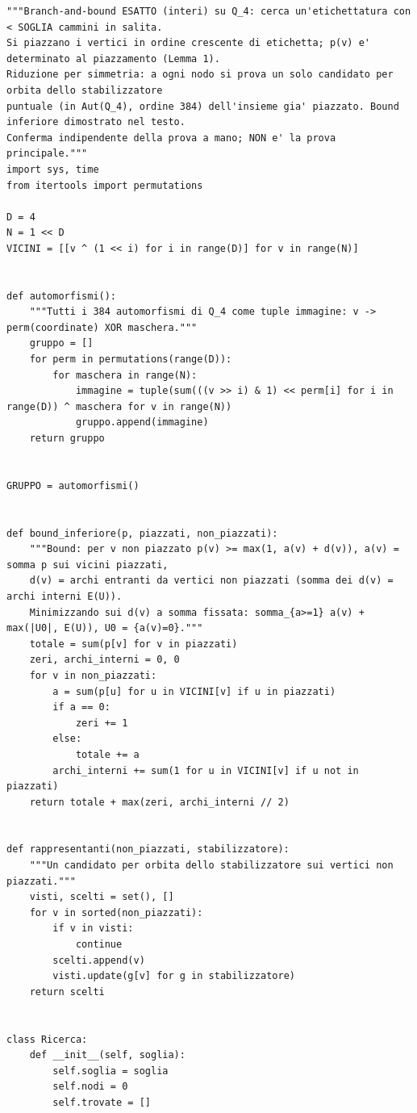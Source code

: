 \documentclass[11pt,a4paper]{article}
\begin{document}
\begin{lstlisting}[caption={attempt\_001 code\_2 [python, rigore exact] — Independent exact confirmation of the lower bound: symmetry-reduced branch-and-bound over  — verdetto del Referee: (nessun verdetto)}]
"""Branch-and-bound ESATTO (interi) su Q_4: cerca un'etichettatura con < SOGLIA cammini in salita.
Si piazzano i vertici in ordine crescente di etichetta; p(v) e' determinato al piazzamento (Lemma 1).
Riduzione per simmetria: a ogni nodo si prova un solo candidato per orbita dello stabilizzatore
puntuale (in Aut(Q_4), ordine 384) dell'insieme gia' piazzato. Bound inferiore dimostrato nel testo.
Conferma indipendente della prova a mano; NON e' la prova principale."""
import sys, time
from itertools import permutations

D = 4
N = 1 << D
VICINI = [[v ^ (1 << i) for i in range(D)] for v in range(N)]


def automorfismi():
    """Tutti i 384 automorfismi di Q_4 come tuple immagine: v -> perm(coordinate) XOR maschera."""
    gruppo = []
    for perm in permutations(range(D)):
        for maschera in range(N):
            immagine = tuple(sum(((v >> i) & 1) << perm[i] for i in range(D)) ^ maschera for v in range(N))
            gruppo.append(immagine)
    return gruppo


GRUPPO = automorfismi()


def bound_inferiore(p, piazzati, non_piazzati):
    """Bound: per v non piazzato p(v) >= max(1, a(v) + d(v)), a(v) = somma p sui vicini piazzati,
    d(v) = archi entranti da vertici non piazzati (somma dei d(v) = archi interni E(U)).
    Minimizzando sui d(v) a somma fissata: somma_{a>=1} a(v) + max(|U0|, E(U)), U0 = {a(v)=0}."""
    totale = sum(p[v] for v in piazzati)
    zeri, archi_interni = 0, 0
    for v in non_piazzati:
        a = sum(p[u] for u in VICINI[v] if u in piazzati)
        if a == 0:
            zeri += 1
        else:
            totale += a
        archi_interni += sum(1 for u in VICINI[v] if u not in piazzati)
    return totale + max(zeri, archi_interni // 2)


def rappresentanti(non_piazzati, stabilizzatore):
    """Un candidato per orbita dello stabilizzatore sui vertici non piazzati."""
    visti, scelti = set(), []
    for v in sorted(non_piazzati):
        if v in visti:
            continue
        scelti.append(v)
        visti.update(g[v] for g in stabilizzatore)
    return scelti


class Ricerca:
    def __init__(self, soglia):
        self.soglia = soglia
        self.nodi = 0
        self.trovate = []


\end{lstlisting}
\end{document}
